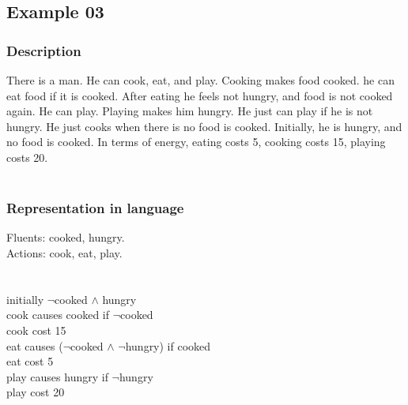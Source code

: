 \documentclass[11pt]{article}
\begin{document}
	\subsection{Example 03}
	\subsubsection{Description}\label{par:p103}
	There is a man. He can cook, eat, and play. Cooking makes food cooked. he can eat food if it is cooked. After eating he feels not hungry, and food is not cooked again. He can play. Playing makes him hungry. He just can play if he is not hungry. He just cooks when there is no food is cooked. Initially, he is hungry, and no food is cooked. In terms of energy, eating costs 5, cooking costs 15, playing costs 20.\\
	\\
	\subsubsection{Representation in language}\label{par:p203}
	Fluents: cooked, hungry.\\
	Actions: cook, eat, play.\\
	\\
	\\
	initially $\neg$cooked $\land$ hungry\\
	cook causes cooked if $\neg$cooked\\
	cook cost 15\\
	eat causes ($\neg$cooked $\land$ $\neg$hungry) if cooked\\
	eat cost 5\\
	play causes hungry if $\neg$hungry\\
	play cost 20\\
	\\
\end{document}
